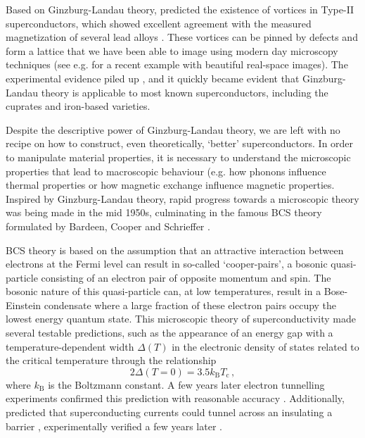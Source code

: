 Based on Ginzburg-Landau theory, \citeauthor{Abrikosov1957} predicted the existence of vortices in Type-II superconductors, which showed excellent agreement with the measured magnetization of several lead alloys \cite{Abrikosov1957}. These vortices can be pinned by defects and form a lattice that we have been able to image using modern day microscopy techniques (see e.g. \cite{Wells2015} for a recent example with beautiful real-space images). The experimental evidence piled up \cite{Doll1961, Deaver1961}, and it quickly became evident that Ginzburg-Landau theory is applicable to most known superconductors, including the cuprates and iron-based varieties.

Despite the descriptive power of Ginzburg-Landau theory, we are left with no recipe on how to construct, even theoretically, `better' superconductors. In order to manipulate material properties, it is necessary to understand the microscopic properties that lead to macroscopic behaviour (e.g. how phonons influence thermal properties or how magnetic exchange influence magnetic properties. Inspired by Ginzburg-Landau theory, rapid progress towards a microscopic theory was being made in the mid 1950s, culminating in the famous BCS theory formulated by Bardeen, Cooper and Schrieffer \cite{Bardeen1957}. 

BCS theory is based on the assumption that an attractive interaction between electrons at the Fermi level can result in so-called `cooper-pairs', a bosonic quasi-particle consisting of an electron pair of opposite momentum and spin. The bosonic nature of this quasi-particle can, at low temperatures, result in a Bose-Einstein condensate where a large fraction of these electron pairs occupy the lowest energy quantum state. This microscopic theory of superconductivity made several testable predictions, such as the appearance of an energy gap with a temperature-dependent width $\Delta(T)$ in the electronic density of states related to the critical temperature through the relationship
%
\[ 2\Delta(T=0) = 3.5 k_\text{B} T_\text{c} \, , \]
%
where $k_\text{B}$ is the Boltzmann constant. A few years later electron tunnelling experiments confirmed this prediction with reasonable accuracy \cite{Giaever1960, Giaever1960a}. Additionally, \citeauthor{Josephson1962} predicted that superconducting currents could tunnel across an insulating a barrier \cite{Josephson1962}, experimentally verified a few years later \cite{Jaklevic1965}.

